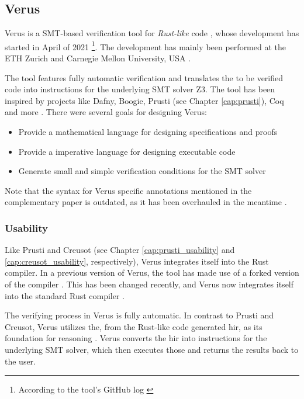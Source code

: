 \subsection{Verus}

Verus is a SMT-based verification tool for \textit{Rust-like} code \cite{lattuadaVerusVerifyingRust2023,verus-lang_goals_2023}, whose development has started in April of 2021 \footnote{According to the tool's GitHub log \cite{verus-lang_add_2021}}. The development has mainly been performed at the ETH Zurich and Carnegie Mellon University, USA \cite{lattuadaVerusVerifyingRust2023}.

The tool features fully automatic verification and translates the to be verified code into instructions for the underlying SMT solver Z3. The tool has been inspired by projects like Dafny, Boogie, Prusti (see Chapter \ref{cap:prusti}), Coq and more \cite{verus-lang_goals_2023}. There were several goals for designing Verus:

\begin{itemize}
    \item Provide a mathematical language for designing specifications and proofs \cite{lattuadaVerusVerifyingRust2023}
    \item Provide a imperative language for designing executable code \cite{lattuadaVerusVerifyingRust2023}
    \item Generate small and simple verification conditions for the SMT solver \cite{lattuadaVerusVerifyingRust2023}
\end{itemize}

Note that the syntax for Verus specific annotations mentioned in the complementary paper \cite{lattuadaVerusVerifyingRust2023} is outdated, as it has been overhauled in the meantime \cite{chris_hawblitzel_doc_2023}. 

\subsubsection{Usability}

Like Prusti and Creusot (see Chapter \ref{cap:prusti_usability} and \ref{cap:creusot_usability}, respectively), Verus integrates itself into the Rust compiler. In a previous version of Verus, the tool has made use of a forked version of the compiler \cite{lattuadaVerusVerifyingRust2023}. This has been changed recently, and Verus now integrates itself into the standard Rust compiler \cite{andrea_lattuada_port_2023}.

The verifying process in Verus is fully automatic. In contrast to Prusti and Creusot, Verus utilizes the, from the Rust-like code generated \acs{hir}, as its foundation for reasoning \cite{chris_hawblitzel_verussourcecodemd_2021}. Verus converts the \acs{hir} into instructions for the underlying SMT solver, which then executes those and returns the results back to the user.

